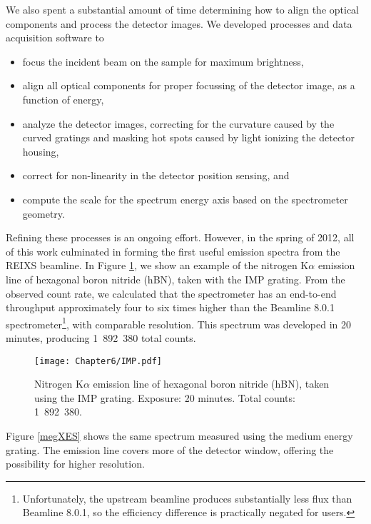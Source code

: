 We also spent a substantial amount of time determining how to align the optical components and process the detector images.  We developed processes and data acquisition software to
\begin{itemize}
\item focus the incident beam on the sample for maximum brightness,
\item align all optical components for proper focussing of the detector image, as a function of energy,
\item analyze the detector images, correcting for the curvature caused by the curved gratings and masking hot spots caused by light ionizing the detector housing,
\item correct for non-linearity in the detector position sensing, and
\item compute the scale for the spectrum energy axis based on the spectrometer geometry.
\end{itemize}

Refining these processes is an ongoing effort.  However, in the spring of 2012, all of this work culminated in forming the first useful emission spectra from the REIXS beamline.  In Figure \ref{impXES}, we show an example of the nitrogen K$\alpha$ emission line of hexagonal boron nitride (hBN), taken with the IMP grating.  From the observed count rate, we calculated that the spectrometer has an end-to-end throughput approximately four to six times higher than the Beamline 8.0.1 spectrometer\footnote{Unfortunately, the upstream beamline produces substantially less flux than Beamline 8.0.1, so the efficiency difference is practically negated for users.}, with comparable resolution.  This spectrum was developed in 20 minutes, producing 1~892~380 total counts.

\begin{figure}[htbp] %
   \centering
   \texttt{[image: Chapter6/IMP.pdf]} 
   \caption[Nitrogen K$\alpha$ emission line of hexagonal boron nitride (hBN), taken using the IMP grating.]{Nitrogen K$\alpha$ emission line of hexagonal boron nitride (hBN), taken using the IMP grating.  Exposure: 20 minutes.  Total counts: 1~892~380.}
   \label{impXES}
\end{figure}

Figure \ref{megXES} shows the same spectrum measured using the medium energy grating.  The emission line covers more of the detector window, offering the possibility for higher resolution.

